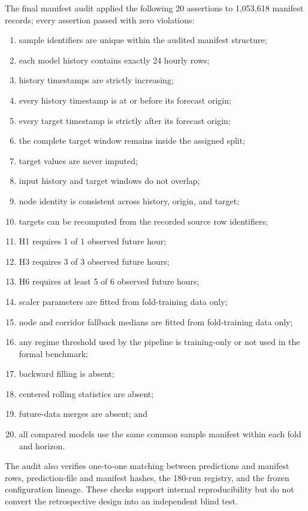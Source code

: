 \documentclass[pdflatex,sn-basic,Numbered]{sn-jnl}
\begin{document}
The final manifest audit applied the following 20 assertions to 1,053,618 manifest records; every assertion passed with zero violations:
\begin{enumerate}
    \item sample identifiers are unique within the audited manifest structure;
    \item each model history contains exactly 24 hourly rows;
    \item history timestamps are strictly increasing;
    \item every history timestamp is at or before its forecast origin;
    \item every target timestamp is strictly after its forecast origin;
    \item the complete target window remains inside the assigned split;
    \item target values are never imputed;
    \item input history and target windows do not overlap;
    \item node identity is consistent across history, origin, and target;
    \item targets can be recomputed from the recorded source row identifiers;
    \item H1 requires 1 of 1 observed future hour;
    \item H3 requires 3 of 3 observed future hours;
    \item H6 requires at least 5 of 6 observed future hours;
    \item scaler parameters are fitted from fold-training data only;
    \item node and corridor fallback medians are fitted from fold-training data only;
    \item any regime threshold used by the pipeline is training-only or not used in the formal benchmark;
    \item backward filling is absent;
    \item centered rolling statistics are absent;
    \item future-data merges are absent; and
    \item all compared models use the same common sample manifest within each fold and horizon.
\end{enumerate}

The audit also verifies one-to-one matching between predictions and manifest rows, prediction-file and manifest hashes, the 180-run registry, and the frozen configuration lineage. These checks support internal reproducibility but do not convert the retrospective design into an independent blind test.
\end{document}

